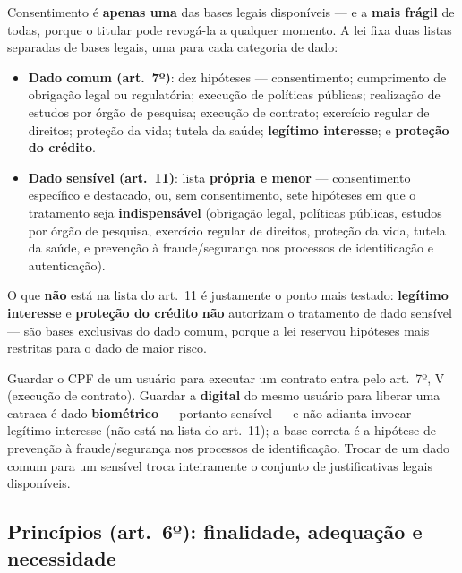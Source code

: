 \begin{conceito}
Consentimento é \textbf{apenas uma} das bases legais disponíveis --- e a
\textbf{mais frágil} de todas, porque o titular pode revogá-la a qualquer
momento. A lei fixa duas listas separadas de bases legais, uma para cada
categoria de dado:

\begin{itemize}
\item \textbf{Dado comum (art.\ 7º)}: dez hipóteses --- consentimento;
cumprimento de obrigação legal ou regulatória; execução de políticas
públicas; realização de estudos por órgão de pesquisa; execução de
contrato; exercício regular de direitos; proteção da vida; tutela da
saúde; \textbf{legítimo interesse}; e \textbf{proteção do crédito}.
\item \textbf{Dado sensível (art.\ 11)}: lista \textbf{própria e menor} ---
consentimento específico e destacado, ou, sem consentimento, sete
hipóteses em que o tratamento seja \textbf{indispensável} (obrigação
legal, políticas públicas, estudos por órgão de pesquisa, exercício
regular de direitos, proteção da vida, tutela da saúde, e prevenção à
fraude/segurança nos processos de identificação e autenticação).
\end{itemize}

O que \textbf{não} está na lista do art.\ 11 é justamente o ponto mais
testado: \textbf{legítimo interesse} e \textbf{proteção do crédito}
\textbf{não} autorizam o tratamento de dado sensível --- são bases
exclusivas do dado comum, porque a lei reservou hipóteses mais restritas
para o dado de maior risco.
\end{conceito}

\begin{exemplo}
Guardar o CPF de um usuário para executar um contrato entra pelo art.\
7º, V (execução de contrato). Guardar a \textbf{digital} do mesmo usuário
para liberar uma catraca é dado \textbf{biométrico} --- portanto sensível
--- e não adianta invocar legítimo interesse (não está na lista do art.\
11); a base correta é a hipótese de prevenção à fraude/segurança nos
processos de identificação. Trocar de um dado comum para um sensível
troca inteiramente o conjunto de justificativas legais disponíveis.
\end{exemplo}

\subsection{Princípios (art.\ 6º): finalidade, adequação e necessidade}

